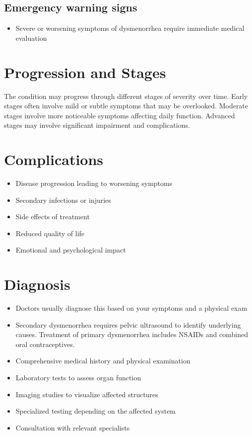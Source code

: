 \subsection{Emergency warning signs}
\begin{itemize}[noitemsep]
  \item Severe or worsening symptoms of dysmenorrhea require immediate medical evaluation
\end{itemize}
\section{Progression and Stages}
The condition may progress through different stages of severity over time. Early stages often involve mild or subtle symptoms that may be overlooked. Moderate stages involve more noticeable symptoms affecting daily function. Advanced stages may involve significant impairment and complications.
\section{Complications}
\begin{itemize}[noitemsep]
  \item Disease progression leading to worsening symptoms
  \item Secondary infections or injuries
  \item Side effects of treatment
  \item Reduced quality of life
  \item Emotional and psychological impact
\end{itemize}
\section{Diagnosis}
\begin{itemize}[noitemsep]
  \item Doctors usually diagnose this based on your symptoms and a physical exam
  \item Secondary dysmenorrhea requires pelvic ultrasound to identify underlying causes. Treatment of primary dysmenorrhea includes NSAIDs and combined oral contraceptives.
  \item Comprehensive medical history and physical examination
  \item Laboratory tests to assess organ function
  \item Imaging studies to visualize affected structures
  \item Specialized testing depending on the affected system
  \item Consultation with relevant specialists
\end{itemize}
